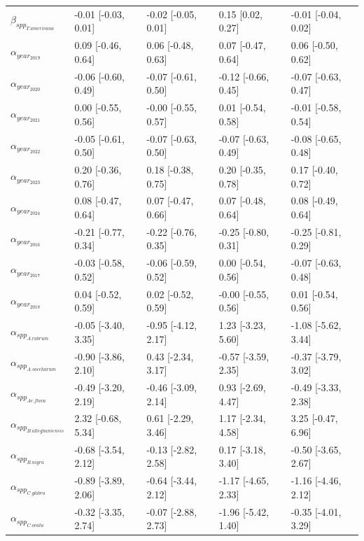 \documentclass{article}\usepackage[]{graphicx}\usepackage[]{xcolor}
\begin{document}
\begin{table}[ht]
\begin{tabular}{lllll}
  $\beta_{spp_{T. americana}}$ & -0.01 [-0.03, 0.01] & -0.02 [-0.05, 0.01] & 0.15 [0.02, 0.27] & -0.01 [-0.04, 0.02] \\ 
  $\alpha_{year_{2019}}$ & 0.09 [-0.46, 0.64] & 0.06 [-0.48, 0.63] & 0.07 [-0.47, 0.64] & 0.06 [-0.50, 0.62] \\ 
  $\alpha_{year_{2020}}$ & -0.06 [-0.60, 0.49] & -0.07 [-0.61, 0.50] & -0.12 [-0.66, 0.45] & -0.07 [-0.63, 0.47] \\ 
  $\alpha_{year_{2021}}$ & 0.00 [-0.55, 0.56] & -0.00 [-0.55, 0.57] & 0.01 [-0.54, 0.58] & -0.01 [-0.58, 0.54] \\ 
  $\alpha_{year_{2022}}$ & -0.05 [-0.61, 0.50] & -0.07 [-0.63, 0.50] & -0.07 [-0.63, 0.49] & -0.08 [-0.65, 0.48] \\ 
  $\alpha_{year_{2023}}$ & 0.20 [-0.36, 0.76] & 0.18 [-0.38, 0.75] & 0.20 [-0.35, 0.78] & 0.17 [-0.40, 0.72] \\ 
  $\alpha_{year_{2024}}$ & 0.08 [-0.47, 0.64] & 0.07 [-0.47, 0.66] & 0.07 [-0.48, 0.64] & 0.08 [-0.49, 0.64] \\ 
  $\alpha_{year_{2016}}$ & -0.21 [-0.77, 0.34] & -0.22 [-0.76, 0.35] & -0.25 [-0.80, 0.31] & -0.25 [-0.81, 0.29] \\ 
  $\alpha_{year_{2017}}$ & -0.03 [-0.58, 0.52] & -0.06 [-0.59, 0.52] & 0.00 [-0.54, 0.56] & -0.07 [-0.63, 0.48] \\ 
  $\alpha_{year_{2018}}$ & 0.04 [-0.52, 0.59] & 0.02 [-0.52, 0.59] & -0.00 [-0.55, 0.56] & 0.01 [-0.54, 0.56] \\ 
  $\alpha_{spp_{A. rubrum}}$ & -0.05 [-3.40, 3.35] & -0.95 [-4.12, 2.17] & 1.23 [-3.23, 5.60] & -1.08 [-5.62, 3.44] \\ 
  $\alpha_{spp_{A. saccharum}}$ & -0.90 [-3.86, 2.10] & 0.43 [-2.34, 3.17] & -0.57 [-3.59, 2.35] & -0.37 [-3.79, 3.02] \\ 
  $\alpha_{spp_{Ae. flava}}$ & -0.49 [-3.20, 2.19] & -0.46 [-3.09, 2.14] & 0.93 [-2.69, 4.47] & -0.49 [-3.33, 2.38] \\ 
  $\alpha_{spp_{B. alleghaniensis}}$ & 2.32 [-0.68, 5.34] & 0.61 [-2.29, 3.46] & 1.17 [-2.34, 4.58] & 3.25 [-0.47, 6.96] \\ 
  $\alpha_{spp_{B. nigra}}$ & -0.68 [-3.54, 2.12] & -0.13 [-2.82, 2.58] & 0.17 [-3.18, 3.40] & -0.50 [-3.65, 2.67] \\ 
  $\alpha_{spp_{C. glabra}}$ & -0.89 [-3.89, 2.06] & -0.64 [-3.44, 2.12] & -1.17 [-4.65, 2.33] & -1.16 [-4.46, 2.12] \\ 
  $\alpha_{spp_{C. ovata}}$ & -0.32 [-3.35, 2.74] & -0.07 [-2.88, 2.73] & -1.96 [-5.42, 1.40] & -0.35 [-4.01, 3.29] \\ 

\end{tabular}
\end{table}
\end{document}

